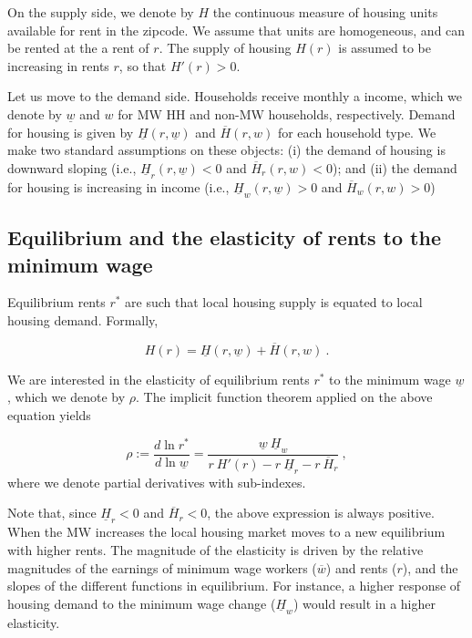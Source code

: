 On the supply side, we denote by $H$ the continuous measure of housing units available for rent 
in the zipcode. We assume that units are homogeneous, and can be rented at the a rent of $r$. The 
supply of housing $H(r)$ is assumed to be increasing in rents $r$, so that $H'(r) > 0$.

Let us move to the demand side. Households receive monthly a income, which we denote by 
$\underline{w}$ and $w$ for MW HH and non-MW households, respectively. Demand for housing is given 
by $\underline{H}(r, \underline{w})$ and $\overline{H}(r, w)$ for each household type. We make two 
standard assumptions on these objects: (i) the demand of housing is downward sloping (i.e., 
$\underline{H}_r(r, \underline{w}) < 0$ and $\overline{H}_r(r, w) < 0$); and (ii) the demand for 
housing is increasing in income (i.e., $\underline{H}_w(r, \underline{w}) > 0$ and $\overline{H}_w(r, 
w) > 0$)


\subsection{Equilibrium and the elasticity of rents to the minimum wage}

Equilibrium rents $r^*$ are such that local housing supply is equated to local housing demand. 
Formally,

\begin{equation*}\label{eq:model-eq}
H(r) =  \underline{H}(r, \underline{w}) + \overline{H}(r, w) \ .
\end{equation*}

We are interested in the elasticity of equilibrium rents $r^*$ to the minimum wage $\underline{w}$, 
which we denote by $\rho$. The implicit function theorem applied on the above equation yields

\begin{equation}\label{eq:model-elasticity}
\rho := \frac{d \ln r^*}{d \ln \underline{w}} 
= \frac{\underline{w} \ \underline{H}_w}
{r\  H'(r) - r \ \underline{H}_r - r \ \overline{H}_r} \ ,
\end{equation}
where we denote partial derivatives with sub-indexes.

Note that, since $\underline{H}_r < 0$ and $\overline{H}_r < 0$, the above expression is always 
positive. When the MW increases the local housing market moves to a new equilibrium with higher 
rents. The magnitude of the elasticity is driven by the relative magnitudes of the earnings of 
minimum wage workers ($\overline{w}$) and rents ($r$), and the slopes of the different 
functions in equilibrium. For instance, a higher response of housing demand to the minimum wage 
change ($\underline{H}_w$) would result in a higher elasticity.